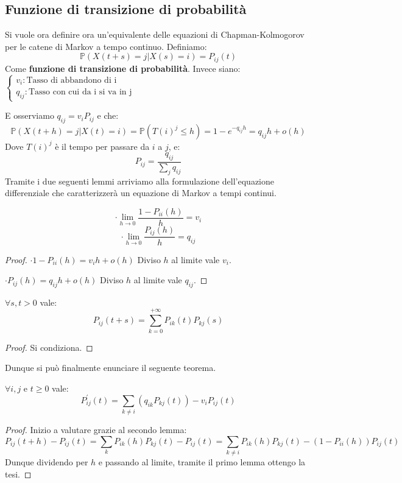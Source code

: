 \subsection{Funzione di transizione di probabilità}

Si vuole ora definire ora un'equivalente delle equazioni di Chapman-Kolmogorov per le catene di Markov a tempo continuo. Definiamo:
\[\mathbb{P}(X(t+s)=j|X(s)=i)=P_{ij}(t)\]
Come \textbf{funzione di transizione di probabilità}. Invece siano:
$\begin{cases}
v_i : \text{Tasso di abbandono di i} \\
q_{ij} : \text{Tasso con cui da i si va in j}
\end{cases}$

E osserviamo $q_{ij}=v_iP_{ij}$ e che:
\[\mathbb{P}(X(t+h)=j|X(t)=i)=\mathbb{P}(T(i)^j\leq h)=1-e^{-q_{ij}h}=q_{ij}h+o(h)\]
Dove $T(i)^j$ è il tempo per passare da $i$ a $j$, e:
\[P_{ij}=\frac{q_{ij}}{\sum_jq_{ij}}\]
Tramite i due seguenti lemmi arriviamo alla formulazione dell'equazione differenziale che caratterizzerà un equazione di Markov a tempi continui.
\begin{lemma}
\[\cdot \lim_{h\to0}\frac{1-P_{ii}(h)}{h}=v_i\]
\[\cdot \lim_{h\to0}\frac{P_{ij}(h)}{h}=q_{ij}\]
\vspace{5px}
\begin{proof}
$\cdot 1-P_{ii}(h)=v_ih+o(h)$
Diviso $h$ al limite vale $v_i$.

$\cdot P_{ij}(h)=q_{ij}h+o(h)$
Diviso $h$ al limite vale $q_{ij}$.
\end{proof}
\end{lemma}

\begin{lemma}
$\forall s,t>0$ vale: 
\[P_{ij}(t+s)=\sum_{k=0}^{+\infty}P_{ik}(t)P_{kj}(s)\]
\begin{proof}
Si condiziona.
\end{proof}
\end{lemma}

Dunque si può finalmente enunciare il seguente teorema.
\begin{theorem}
$\forall i,j$ e $t\geq0$ vale:
\[P^{'}_{ij}(t)=\sum_{k\neq i}\left(q_{ik}P_{kj}(t)\right)-v_iP_{ij}(t)\]
\begin{proof}
Inizio a valutare grazie al secondo lemma:
\[P_{ij}(t+h)-P_{ij}(t)=\sum_kP_{ik}(h)P_{kj}(t)-P_{ij}(t)=\sum_{k\neq i}P_{ik}(h)P_{kj}(t)-(1-P_{ii}(h))P_{ij}(t)\]
Dunque dividendo per $h$ e passando al limite, tramite il primo lemma ottengo la tesi.
\end{proof}
\end{theorem}

